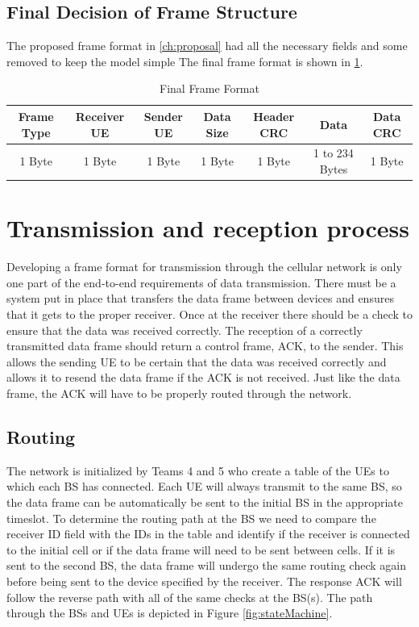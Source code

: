 \subsection{Final Decision of Frame Structure}



The proposed frame format in \ref{ch:proposal} had all the necessary fields and some removed to keep the model simple
The final frame format is  shown in \ref{tab:finalFrame}.

\begin{table}
\begin{center}
\begin{tabular}{| c | c | c | c | c | c | c | }
  \hline                       
  Frame Type & Receiver UE & Sender UE & Data Size & Header CRC & Data & Data CRC\\
  \hline
	1 Byte & 1 Byte & 1 Byte & 1 Byte & 1 Byte & 1 to 234 Bytes & 1 Byte\\
  
  \hline  
\end{tabular}
\end{center}
 \caption{Final Frame Format}
	\label{tab:finalFrame}
\end{table}

\section{Transmission and reception process}

Developing a frame format for transmission through the cellular network is only one part of the end-to-end requirements of data transmission. There must be a system put in place that transfers the data frame between devices and ensures that it gets to the proper receiver. Once at the receiver there should be a check to ensure that the data was received correctly. The reception of a correctly transmitted data frame should return a control frame, ACK, to the sender.  This allows the sending UE to be certain that the data was received correctly and allows it to resend the data frame if the ACK is not received. Just like the data frame, the ACK will have to be properly routed through the network. 

\subsection {Routing}

The network is initialized by Teams 4 and 5 who create a table of the UEs to which each BS has connected. Each UE will always transmit to the same BS, so the data frame can be automatically be sent to the initial BS in the appropriate timeslot.  To determine the routing path at the BS we need to compare the receiver ID field with the IDs in the table and identify if the receiver is connected to the initial cell or if the data frame will need to be sent between cells. If it is sent to the second BS, the data frame will undergo the same routing check again before being sent to the device specified by the receiver. The response ACK will follow the reverse path with all of the same checks at the BS(s). The path through the BSs and UEs is depicted in Figure \ref{fig:stateMachine}.


